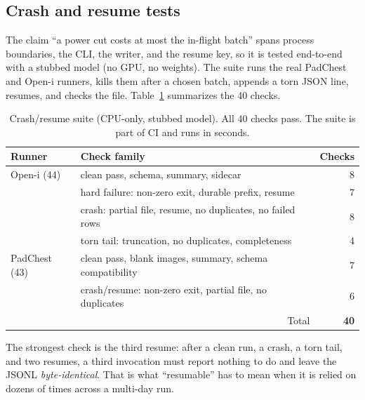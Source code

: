 \subsection{Crash and resume tests}

The claim ``a power cut costs at most the in-flight batch'' spans process boundaries, the CLI, the writer, and the resume key, so it is tested end-to-end with a stubbed model (no GPU, no weights). The suite runs the real PadChest and Open-i runners, kills them after a chosen batch, appends a torn JSON line, resumes, and checks the file. Table~\ref{tab:resume} summarizes the 40 checks.

\begin{table}[t]
\centering
\small
\caption{Crash/resume suite (CPU-only, stubbed model). All 40 checks pass. The suite is part of CI and runs in seconds.}
\label{tab:resume}
\begin{tabular}{llr}
\toprule
Runner & Check family & Checks \\
\midrule
Open-i (44) & clean pass, schema, summary, sidecar & 8 \\
 & hard failure: non-zero exit, durable prefix, resume & 7 \\
 & crash: partial file, resume, no duplicates, no failed rows & 8 \\
 & torn tail: truncation, no duplicates, completeness & 4 \\
PadChest (43) & clean pass, blank images, summary, schema compatibility & 7 \\
 & crash/resume: non-zero exit, partial file, no duplicates & 6 \\
\midrule
\multicolumn{2}{r}{Total} & \textbf{40} \\
\bottomrule
\end{tabular}
\end{table}

The strongest check is the third resume: after a clean run, a crash, a torn tail, and two resumes, a third invocation must report nothing to do and leave the JSONL \emph{byte-identical}. That is what ``resumable'' has to mean when it is relied on dozens of times across a multi-day run.
